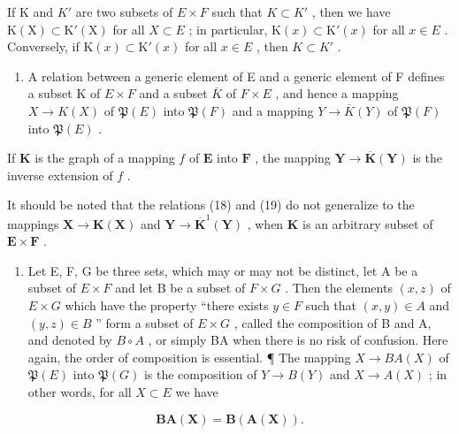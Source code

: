 If K and \(K'\) are two subsets of \(E \times F\) such that \(K \subset K'\) , then we have \(\mathrm{K}(\mathrm{X}) \subset \mathrm{K}'(\mathrm{X})\) for all \(X \subset E\) ; in particular, \(\mathrm{K}(x) \subset \mathrm{K}'(x)\) for all \(x \in E\) . Conversely, if \(\mathrm{K}(x) \subset \mathrm{K}'(x)\) for all \(x \in E\) , then \(K \subset K'\) .

\begin{enumerate}
\def\labelenumi{\arabic{enumi}.}
\setcounter{enumi}{8}
\tightlist
\item
  A relation between a generic element of E and a generic element of F defines a subset K of \(E \times F\) and a subset \(\overline{K}\) of \(F \times E\) , and hence a mapping \(X \to K(X)\) of \(\mathfrak{P}(E)\) into \(\mathfrak{P}(F)\) and a mapping \(Y \to \overline{K}(Y)\) of \(\mathfrak{P}(F)\) into \(\mathfrak{P}(E)\) .
\end{enumerate}

If \(\mathbf{K}\) is the graph of a mapping \(f\) of \(\mathbf{E}\) into \(\mathbf{F}\) , the mapping \(\mathbf{Y} \to \overline{\mathbf{K}}(\mathbf{Y})\) is the inverse extension of \(f\) .

It should be noted that the relations (18) and (19) do not generalize to the mappings \(\mathbf{X} \to \mathbf{K}(\mathbf{X})\) and \(\mathbf{Y} \to \overline{\mathbf{K}}^{1}(\mathbf{Y})\) , when \(\mathbf{K}\) is an arbitrary subset of \(\mathbf{E} \times \mathbf{F}\) .

\begin{enumerate}
\def\labelenumi{\arabic{enumi}.}
\setcounter{enumi}{9}
\tightlist
\item
  Let E, F, G be three sets, which may or may not be distinct, let A be a subset of \(E \times F\) and let B be a subset of \(F \times G\) . Then the elements \((x, z)\) of \(E \times G\) which have the property ``there exists \(y \in F\) such that \((x, y) \in A\) and \((y, z) \in B\) '' form a subset of \(E \times G\) , called the composition of B and A, and denoted by \(B \circ A\) , or simply BA when there is no risk of confusion. Here again, the order of composition is essential. ¶ The mapping \(X \to BA(X)\) of \(\mathfrak{P}(E)\) into \(\mathfrak{P}(G)\) is the composition of \(Y \to B(Y)\) and \(X \to A(X)\) ; in other words, for all \(X \subset E\) we have
\end{enumerate}

\[
\mathbf {B A} (\mathbf {X}) = \mathbf {B} (\mathbf {A} (\mathbf {X})).\tag{30}
\]

